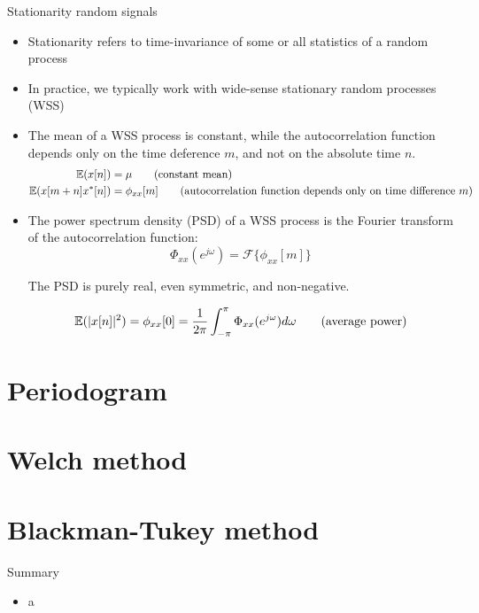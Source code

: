 \documentclass[10pt]{beamer}
\begin{document}
\begin{frame}{Stationarity random signals}
	\begin{itemize}
		\item Stationarity refers to time-invariance of some or all statistics of a random process
		\item In practice, we typically work with wide-sense stationary random processes (WSS)
		\item The mean of a WSS process is constant, while the autocorrelation function depends only on the time deference $m$, and not on the absolute time $n$.
		\begin{align}
			\operatorname{\mathbb{E}}(x[n]) &=\mu \tag{constant mean} \\
			\operatorname{\mathbb{E}}(x[m+n]x^*[n]) &= \phi_{xx}[m] \tag{autocorrelation function depends only on time difference $m$}
		\end{align}
		\item The power spectrum density (PSD) of a WSS process is the Fourier transform of the autocorrelation function:
		\begin{equation*}
			\Phi_{xx}(e^{j\omega}) = \mathcal{F}\{\phi_{xx}[m]\}
		\end{equation*}
		
		The PSD is purely real, even symmetric, and non-negative. 
		
		\begin{equation}
			\operatorname{\mathbb{E}}(|x[n]|^2) = \phi_{xx}[0] = \frac{1}{2\pi}\int_{-\pi}^{\pi} \Phi_{xx}(e^{j\omega}) d\omega \tag{average power}
		\end{equation}
	\end{itemize}
\end{frame}

\section{Periodogram}
\section{Welch method}
\section{Blackman-Tukey method}

%
\begin{frame}{Summary}
	\begin{itemize}
		\item a
	\end{itemize}
\end{frame}
\end{document}
